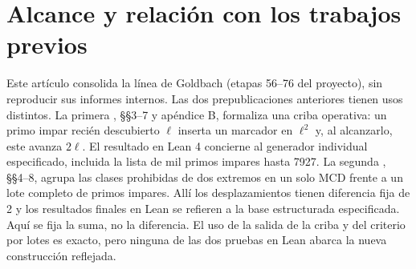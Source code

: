\documentclass[11pt,a4paper]{article}
\newcommand{\B}[2]{#2}
\newcommand{\B}[2]{#1}
\begin{document}
\section{\B{Scope and relationship to prior work}{Alcance y relación con los trabajos previos}}
\B{This paper consolidates the Goldbach research line (project stages 56--76) rather than reproducing its internal reports. The two earlier preprints have sharply different uses. The first \cite{additive}, §§3--7 and Appendix B, formalizes an operational sieve: a newly discovered odd prime $\ell$ inserts a marker at $\ell^2$, then each encounter advances it by $2\ell$. Its Lean 4 result concerns the specified single-prime stream, including the published list of 1000 odd primes through 7927. The second \cite{twins}, §§4--8, groups forbidden residues for two endpoints into a single GCD against a complete odd-prime batch. The shifts there have a fixed gap of 2, and the final Lean statements concern the specified structured base. Here it is the sum, not the gap, that is fixed. The use of the sieve output and the batch criterion is exact, but the new reflected construction is not covered by either Lean proof.}{Este artículo consolida la línea de Goldbach (etapas 56--76 del proyecto), sin reproducir sus informes internos. Las dos prepublicaciones anteriores tienen usos distintos. La primera \cite{additive}, §§3--7 y apéndice B, formaliza una criba operativa: un primo impar recién descubierto $\ell$ inserta un marcador en $\ell^2$ y, al alcanzarlo, este avanza $2\ell$. El resultado en Lean 4 concierne al generador individual especificado, incluida la lista de mil primos impares hasta 7927. La segunda \cite{twins}, §§4--8, agrupa las clases prohibidas de dos extremos en un solo MCD frente a un lote completo de primos impares. Allí los desplazamientos tienen diferencia fija de 2 y los resultados finales en Lean se refieren a la base estructurada especificada. Aquí se fija la suma, no la diferencia. El uso de la salida de la criba y del criterio por lotes es exacto, pero ninguna de las dos pruebas en Lean abarca la nueva construcción reflejada.}
\end{document}
